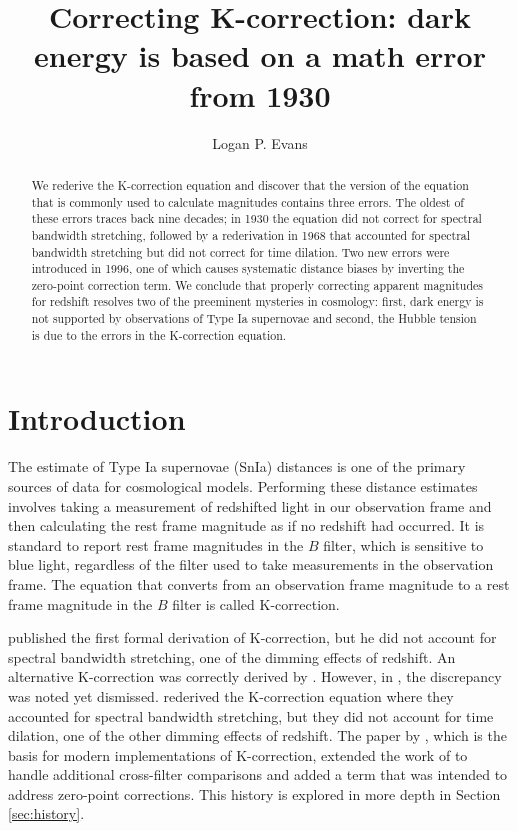 \documentclass[linenumbers]{aastex631}
\begin{document}
\title{Correcting K-correction: dark energy is based on a math error from 1930}


\author[0000-0001-6450-3262]{Logan P. Evans}
\noaffiliation

\begin{abstract}
We rederive the K-correction equation and discover that the version of the
equation that is commonly used to calculate magnitudes contains three errors.
The oldest of these errors traces back nine decades; in 1930 the equation did
not correct for spectral bandwidth stretching, followed by a rederivation in
1968 that accounted for spectral bandwidth stretching but did not correct for
time dilation. Two new errors were introduced in 1996, one of which causes
systematic distance biases by inverting the zero-point correction term. We
conclude that properly correcting apparent magnitudes for redshift resolves two
of the preeminent mysteries in cosmology: first, dark energy is not supported
by observations of Type Ia supernovae and second, the Hubble tension is due to
the errors in the K-correction equation.
\end{abstract}


\section{Introduction}

The estimate of Type Ia supernovae (SnIa) distances is one of the primary
sources of data for cosmological models. Performing these distance estimates
involves taking a measurement of redshifted light in our observation frame and
then calculating the rest frame magnitude as if no redshift had occurred. It is
standard to report rest frame magnitudes in the $B$ filter, which is sensitive to
blue light, regardless of the filter used to take measurements in the
observation frame. The equation that converts from an observation frame
magnitude to a rest frame magnitude in the $B$ filter is called K-correction.

\citet{tolman1930} published the first formal derivation of K-correction, but
he did not account for spectral bandwidth stretching, one of the dimming
effects of redshift. An alternative K-correction was correctly derived by
\citet{desitter1934}. However, in \citet{hubble1935}, the discrepancy was noted
yet dismissed. \citet{oke1968} rederived the K-correction equation where they
accounted for spectral bandwidth stretching, but they did not account for time
dilation, one of the other dimming effects of redshift. The paper by
\citet{kim1996}, which is the basis for modern implementations of K-correction,
extended the work of \citet{oke1968} to handle additional cross-filter
comparisons and added a term that was intended to address zero-point
corrections. This history is explored in more depth in Section
\ref{sec:history}.
\end{document}
